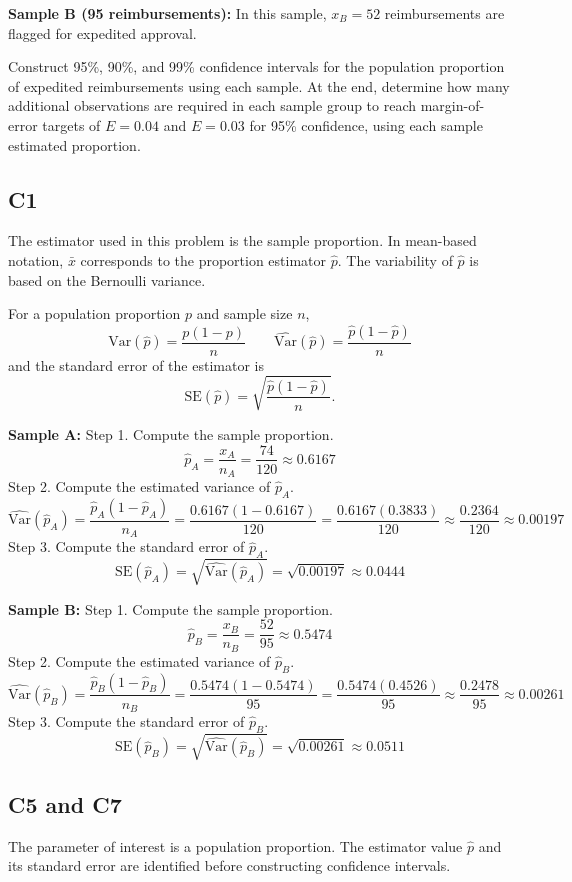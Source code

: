 \begin{ExamProblems}
		\textbf{Sample B (95 reimbursements):}
		In this sample, $x_B = 52$ reimbursements are flagged for expedited approval.
		
		Construct 95\%, 90\%, and 99\% confidence intervals for the population proportion of expedited reimbursements using each sample.
		At the end, determine how many additional observations are required in each sample group to reach margin-of-error targets of $E = 0.04$ and $E = 0.03$ for 95\% confidence, using each sample estimated proportion.
		
		\subsection*{C1}
		The estimator used in this problem is the sample proportion.
		In mean-based notation, $\bar{x}$ corresponds to the proportion estimator $\hat{p}$.
		The variability of $\hat{p}$ is based on the Bernoulli variance.
		
		For a population proportion $p$ and sample size $n$,
		\[
		\mathrm{Var}(\hat{p}) = \frac{p(1-p)}{n}
		\qquad
		\widehat{\mathrm{Var}}(\hat{p}) = \frac{\hat{p}(1-\hat{p})}{n}
		\]
		and the standard error of the estimator is
		\[
		\mathrm{SE}(\hat{p}) = \sqrt{\frac{\hat{p}(1-\hat{p})}{n}}.
		\]
		
		\textbf{Sample A:}
		Step 1.
		Compute the sample proportion.
		\[
		\hat{p}_A = \frac{x_A}{n_A} = \frac{74}{120} \approx 0.6167
		\]
		Step 2.
		Compute the estimated variance of $\hat{p}_A$.
		\[
		\widehat{\mathrm{Var}}(\hat{p}_A) = \frac{\hat{p}_A(1-\hat{p}_A)}{n_A}
		= \frac{0.6167(1-0.6167)}{120}
		= \frac{0.6167(0.3833)}{120}
		\approx \frac{0.2364}{120}
		\approx 0.00197
		\]
		Step 3.
		Compute the standard error of $\hat{p}_A$.
		\[
		\mathrm{SE}(\hat{p}_A) = \sqrt{\widehat{\mathrm{Var}}(\hat{p}_A)}
		= \sqrt{0.00197}
		\approx 0.0444
		\]
		
		\textbf{Sample B:}
		Step 1.
		Compute the sample proportion.
		\[
		\hat{p}_B = \frac{x_B}{n_B} = \frac{52}{95} \approx 0.5474
		\]
		Step 2.
		Compute the estimated variance of $\hat{p}_B$.
		\[
		\widehat{\mathrm{Var}}(\hat{p}_B) = \frac{\hat{p}_B(1-\hat{p}_B)}{n_B}
		= \frac{0.5474(1-0.5474)}{95}
		= \frac{0.5474(0.4526)}{95}
		\approx \frac{0.2478}{95}
		\approx 0.00261
		\]
		Step 3.
		Compute the standard error of $\hat{p}_B$.
		\[
		\mathrm{SE}(\hat{p}_B) = \sqrt{\widehat{\mathrm{Var}}(\hat{p}_B)}
		= \sqrt{0.00261}
		\approx 0.0511
		\]
		
		\subsection*{C5 and C7}
		The parameter of interest is a population proportion.
		The estimator value $\hat{p}$ and its standard error are identified before constructing confidence intervals.
		

\end{ExamProblems}
